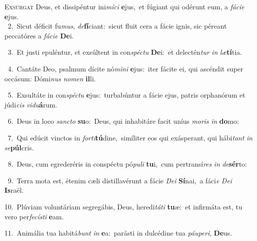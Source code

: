 \lettrine{\initial\textcolor{\initialcolor}{E}}{xsúrgat} Deus, et dissipéntur ini\-\textit{mí}\-\textit{ci} \textbf{e}\-jus,~\star et fúgiant qui odérunt eum, a \textit{fá}\-\textit{ci}\textit{e} \textbf{e}\-jus.\\
{\numbfont\textcolor{\numbcolor}{~2.}}~Sicut déficit fu\-\textit{mus}\-, \textit{de}\-\textbf{fí}ciant:~\star sicut fluit cera a fácie ignis, sic péreant peccatóres a \textit{fá}\-\textit{ci}\textit{e} \textbf{De}\-i.\par
{\numbfont\textcolor{\numbcolor}{~3.}}~Et justi epuléntur, et exsúltent in con\-\textit{spéc}\-\textit{tu} \textbf{De}\-i:~\star et delectén\textit{tur} \textit{in} \textit{læ}\-\textbf{tí}tia.\par
{\numbfont\textcolor{\numbcolor}{~4.}}~Cantáte Deo, psalmum dícite nó\-\textit{mi}\-\textit{ni} \textbf{e}\-jus:~\star iter fácite ei, qui ascéndit super occásum: Dómi\textit{nus} \textit{no}\-\textit{men} \textbf{il}\-li.\par
{\numbfont\textcolor{\numbcolor}{~5.}}~Exsultáte in con\-\textit{spéc}\-\textit{tu} \textbf{e}\-jus:~\star turbabúntur a fácie ejus, patris orphanórum et júdi\textit{cis} \textit{vi}\-\textit{du}\textbf{á}rum.\par
{\numbfont\textcolor{\numbcolor}{~6.}}~Deus in loco \textit{sanc}\-\textit{to} \textbf{su}\-o:~\star Deus, qui inhabitáre facit uníus \textit{mo}\-\textit{ris} \textit{in} \textbf{do}\-mo:\par
{\numbfont\textcolor{\numbcolor}{~7.}}~Qui edúcit vinctos in \textit{for}\-\textit{ti}\textbf{tú}dine,~\star simíliter eos qui exásperant, qui hábi\textit{tant} \textit{in} \textit{se}\-\textbf{púl}cris.\par
{\numbfont\textcolor{\numbcolor}{~8.}}~Deus, cum egrederéris in conspéctu pó\-\textit{pu}\-\textit{li} \textbf{tu}\-i,~\star cum pertransí\textit{res} \textit{in} \textit{de}\-\textbf{sér}to:\par
{\numbfont\textcolor{\numbcolor}{~9.}}~Terra mota est, étenim cæli distillavérunt a fácie \textit{De}\-\textit{i} \textbf{Sí}\-nai,~\star a fáci\textit{e} \textit{De}\-\textit{i} \textbf{Is}\-raël.\par
{\numbfont\textcolor{\numbcolor}{10.}}~Plúviam voluntáriam segregábis, Deus, heredi\-\textit{tá}\-\textit{ti} \textbf{tu}\-æ:~\star et infirmáta est, tu vero per\-\textit{fe}\-\textit{cís}\textit{ti} \textbf{e}\-am.\par
{\numbfont\textcolor{\numbcolor}{11.}}~Animália tua habitá\textit{bunt} \textit{in} \textbf{e}\-a:~\star parásti in dulcédine tua \textit{páu}\-\textit{pe}\textit{ri}, \textbf{De}\-us.\par
